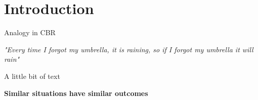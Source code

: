 \section{Introduction}

\begin{frame}{Analogy in CBR}

    \centering\emph{"Every time I forgot my umbrella, it is raining, so if I forgot my umbrella it will rain"}

    \vspace{0.85cm}

    \begin{mdframed}[style=box] 

    A little bit of text
     \end{mdframed}

    \vspace{0.85cm}

    \centering\textbf{Similar situations have similar outcomes}

\end{frame}


